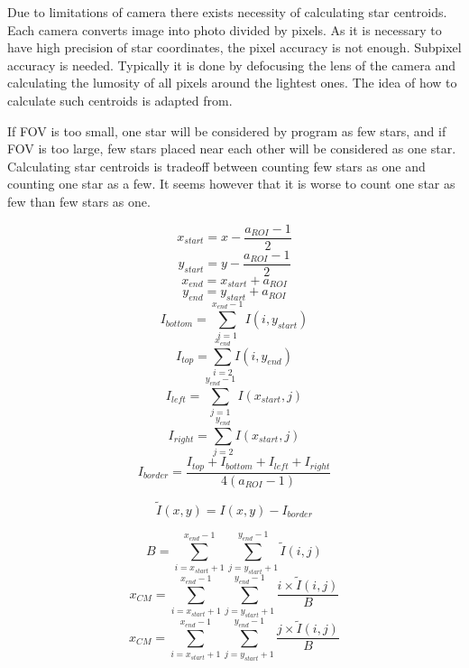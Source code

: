 \documentclass[12pt,a4paper,oneside]{article}
\begin{document}
Due to limitations of camera there exists necessity of calculating star centroids. Each camera converts image into photo divided by pixels. As it is necessary to have high precision of star coordinates, the pixel accuracy is not enough. Subpixel accuracy is needed. Typically it is done by defocusing the lens of the camera and calculating the lumosity of all pixels around the lightest ones. The idea of how to calculate such centroids is adapted from\cite{6187242}.

If FOV is too small, one star will be considered by program as few stars, and if FOV is too large, few stars placed near each other will be considered as one star. Calculating star centroids is tradeoff between counting few stars as one and counting one star as a few. It seems however that it is worse to count one star as few than few stars as one.

\begin{equation}
x_{start} = x - \frac{a_{ROI} - 1}{2}
\end{equation}
\begin{equation}
y_{start} = y - \frac{a_{ROI} - 1}{2}
\end{equation}
\begin{equation}
x_{end} = x_{start} + a_{ROI}
\end{equation}
\begin{equation}
y_{end} = y_{start} + a_{ROI}
\end{equation}
\begin{equation}
I_{bottom} = \sum_{i=1}^{x_{end}-1} I(i, y_{start})
\end{equation}
\begin{equation}
I_{top} = \sum_{i=2}^{x_{end}} I(i, y_{end})
\end{equation}
\begin{equation}
I_{left} = \sum_{j=1}^{y_{end}-1} I(x_{start}, j)
\end{equation}
\begin{equation}
I_{right} = \sum_{j=2}^{y_{end}} I(x_{start}, j)
\end{equation}
\begin{equation}
I_{border} = \frac{I_{top} + I_{bottom} + I_{left} + I_{right}}{4(a_{ROI} - 1)}
\end{equation}

\begin{equation}
\tilde{I}(x,y) = I(x,y) - I_{border}
\end{equation}

\begin{equation}
B = \sum_{i=x_{start}+1}^{x_{end}-1}\sum_{j=y_{start}+1}^{y_{end}-1}\tilde{I}(i,j)
\end{equation}
\begin{equation}
x_{CM} = \sum_{i=x_{start}+1}^{x_{end}-1}\sum_{j=y_{start}+1}^{y_{end}-1}\frac{i \times \tilde{I}(i,j)}{B}
\end{equation}
\begin{equation}
x_{CM} = \sum_{i=x_{start}+1}^{x_{end}-1}\sum_{j=y_{start}+1}^{y_{end}-1}\frac{j \times \tilde{I}(i,j)}{B}
\end{equation}
\end{document}
